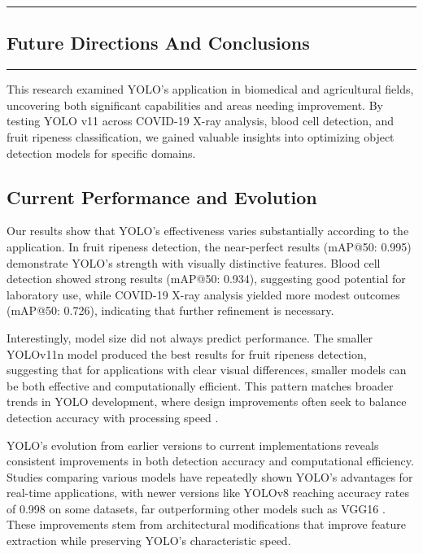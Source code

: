 {\color{gray}\hrule}
\begin{center}
	\section{Future Directions And Conclusions}
	\bigskip
\end{center}
{\color{gray}\hrule}
\vspace{0.5cm}

This research examined YOLO's application in biomedical and agricultural fields, uncovering both significant capabilities and areas needing improvement. By testing YOLO v11 across COVID-19 X-ray analysis, blood cell detection, and fruit ripeness classification, we gained valuable insights into optimizing object detection models for specific domains.

\subsection{Current Performance and Evolution}

Our results show that YOLO's effectiveness varies substantially according to the application. In fruit ripeness detection, the near-perfect results (mAP@50: 0.995) demonstrate YOLO's strength with visually distinctive features. Blood cell detection showed strong results (mAP@50: 0.934), suggesting good potential for laboratory use, while COVID-19 X-ray analysis yielded more modest outcomes (mAP@50: 0.726), indicating that further refinement is necessary.

Interestingly, model size did not always predict performance. The smaller YOLOv11n model produced the best results for fruit ripeness detection, suggesting that for applications with clear visual differences, smaller models can be both effective and computationally efficient. This pattern matches broader trends in YOLO development, where design improvements often seek to balance detection accuracy with processing speed \citep{bochkovskiy2020yolov4}.

YOLO's evolution from earlier versions to current implementations reveals consistent improvements in both detection accuracy and computational efficiency. Studies comparing various models have repeatedly shown YOLO's advantages for real-time applications, with newer versions like YOLOv8 reaching accuracy rates of 0.998 on some datasets, far outperforming other models such as VGG16 \citep{Gunawan2024}. These improvements stem from architectural modifications that improve feature extraction while preserving YOLO's characteristic speed.


